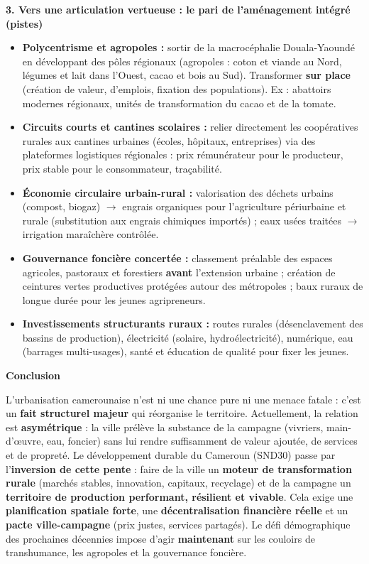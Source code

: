 \documentclass[11pt]{article}
\begin{document}
\begin{exoresolu}
\textbf{3. Vers une articulation vertueuse : le pari de l'aménagement intégré (pistes)}
\begin{itemize}
    \item \textbf{Polycentrisme et agropoles :} sortir de la macrocéphalie Douala-Yaoundé en développant des pôles régionaux (agropoles : coton et viande au Nord, légumes et lait dans l'Ouest, cacao et bois au Sud). Transformer \textbf{sur place} (création de valeur, d'emplois, fixation des populations). Ex : abattoirs modernes régionaux, unités de transformation du cacao et de la tomate.
    \item \textbf{Circuits courts et cantines scolaires :} relier directement les coopératives rurales aux cantines urbaines (écoles, hôpitaux, entreprises) via des plateformes logistiques régionales : prix rémunérateur pour le producteur, prix stable pour le consommateur, traçabilité.
    \item \textbf{Économie circulaire urbain-rural :} valorisation des déchets urbains (compost, biogaz) $\rightarrow$ engrais organiques pour l'agriculture périurbaine et rurale (substitution aux engrais chimiques importés) ; eaux usées traitées $\rightarrow$ irrigation maraîchère contrôlée.
    \item \textbf{Gouvernance foncière concertée :} classement préalable des espaces agricoles, pastoraux et forestiers \textbf{avant} l'extension urbaine ; création de ceintures vertes productives protégées autour des métropoles ; baux ruraux de longue durée pour les jeunes agripreneurs.
    \item \textbf{Investissements structurants ruraux :} routes rurales (désenclavement des bassins de production), électricité (solaire, hydroélectricité), numérique, eau (barrages multi-usages), santé et éducation de qualité pour fixer les jeunes.
\end{itemize}

\textbf{Conclusion}

L'urbanisation camerounaise n'est ni une chance pure ni une menace fatale : c'est un \textbf{fait structurel majeur} qui réorganise le territoire. Actuellement, la relation est \textbf{asymétrique} : la ville prélève la substance de la campagne (vivriers, main-d'œuvre, eau, foncier) sans lui rendre suffisamment de valeur ajoutée, de services et de propreté. Le développement durable du Cameroun (SND30) passe par l'\textbf{inversion de cette pente} : faire de la ville un \textbf{moteur de transformation rurale} (marchés stables, innovation, capitaux, recyclage) et de la campagne un \textbf{territoire de production performant, résilient et vivable}. Cela exige une \textbf{planification spatiale forte}, une \textbf{décentralisation financière réelle} et un \textbf{pacte ville-campagne} (prix justes, services partagés). Le défi démographique des prochaines décennies impose d'agir \textbf{maintenant} sur les couloirs de transhumance, les agropoles et la gouvernance foncière.
\end{exoresolu}
\end{document}
